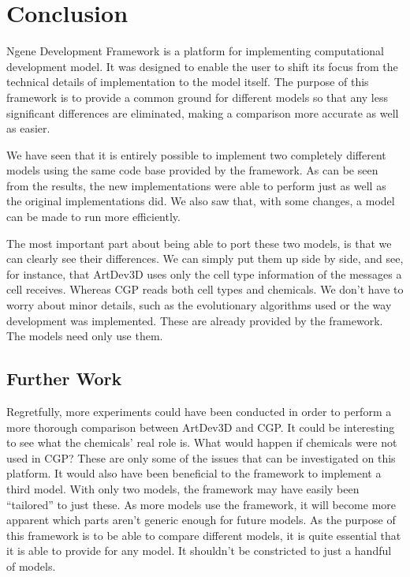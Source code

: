 \section{Conclusion}
Ngene Development Framework is a platform for implementing computational development model. It was designed to enable the user to shift its focus from the technical details of implementation to the model itself. The purpose of this framework is to provide a common ground for different models so that any less significant differences are eliminated, making a comparison more accurate as well as easier.

We have seen that it is entirely possible to implement two completely different models using the same code base provided by the framework. As can be seen from the results, the new implementations were able to perform just as well as the original implementations did. We also saw that, with some changes, a model can be made to run more efficiently.

The most important part about being able to port these two models, is that we can clearly see their differences. We can simply put them up side by side, and see, for instance, that ArtDev3D uses only the cell type information of the messages a cell receives. Whereas CGP reads both cell types and chemicals. We don't have to worry about minor details, such as the evolutionary algorithms used or the way development was implemented. These are already provided by the framework. The models need only use them.


\subsection{Further Work}

Regretfully, more experiments could have been conducted in order to perform a more thorough comparison between ArtDev3D and CGP. It could be interesting to see what the chemicals' real role is. What would happen if chemicals were not used in CGP? These are only some of the issues that can be investigated on this platform. It would also have been beneficial to the framework to implement a third model. With only two models, the framework may have easily been ``tailored'' to just these. As more models use the framework, it will become more apparent which parts aren't generic enough for future models. As the purpose of this framework is to be able to compare different models, it is quite essential that it is able to provide for any model. It shouldn't be constricted to just a handful of models.

